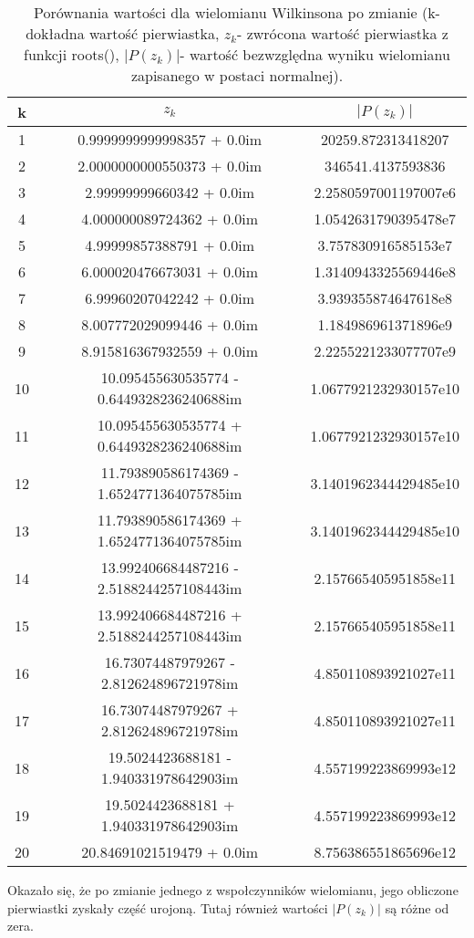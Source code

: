 \documentclass{article}
\begin{document}
\begin{table}[H]
\centering
\begin{tabular}{|c|c|c|}
\hline
k & $z_k$ & $|P(z_k)|$ \\
\hline
1 & 0.9999999999998357 + 0.0im & 20259.872313418207 \\
\hline
2 & 2.0000000000550373 + 0.0im & 346541.4137593836 \\
\hline
3 & 2.99999999660342 + 0.0im & 2.2580597001197007e6 \\
\hline
4 & 4.000000089724362 + 0.0im & 1.0542631790395478e7 \\
\hline
5 & 4.99999857388791 + 0.0im & 3.757830916585153e7 \\
\hline
6 & 6.000020476673031 + 0.0im & 1.3140943325569446e8 \\
\hline
7 & 6.99960207042242 + 0.0im & 3.939355874647618e8 \\
\hline
8 & 8.007772029099446 + 0.0im & 1.184986961371896e9 \\
\hline
9 & 8.915816367932559 + 0.0im & 2.2255221233077707e9 \\
\hline
10 & 10.095455630535774 - 0.6449328236240688im & 1.0677921232930157e10 \\
\hline
11 & 10.095455630535774 + 0.6449328236240688im & 1.0677921232930157e10 \\
\hline
12 & 11.793890586174369 - 1.6524771364075785im & 3.1401962344429485e10 \\
\hline
13 & 11.793890586174369 + 1.6524771364075785im & 3.1401962344429485e10 \\
\hline
14 & 13.992406684487216 - 2.5188244257108443im & 2.157665405951858e11 \\
\hline
15 & 13.992406684487216 + 2.5188244257108443im & 2.157665405951858e11 \\
\hline
16 & 16.73074487979267 - 2.812624896721978im & 4.850110893921027e11 \\
\hline
17 & 16.73074487979267 + 2.812624896721978im & 4.850110893921027e11 \\
\hline
18 & 19.5024423688181 - 1.940331978642903im & 4.557199223869993e12 \\
\hline
19 & 19.5024423688181 + 1.940331978642903im & 4.557199223869993e12 \\
\hline
20 & 20.84691021519479 + 0.0im & 8.756386551865696e12 \\
\hline
\end{tabular}
\caption{Porównania wartości dla wielomianu Wilkinsona po zmianie (k- dokładna wartość pierwiastka, $z_k$- zwrócona wartość pierwiastka z funkcji roots(), $|P(z_k)|$- wartość bezwzględna wyniku wielomianu zapisanego w postaci normalnej).}
\end{table}
Okazało się, że po zmianie jednego z wspołczynników wielomianu, jego obliczone pierwiastki zyskały część urojoną. Tutaj również wartości $|P(z_k)|$ są różne od zera.
\end{document}
